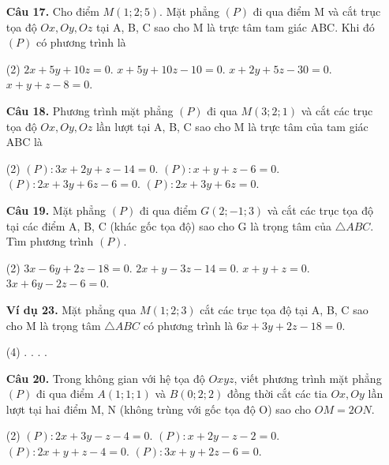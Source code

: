 \documentclass[12pt, a4paper]{article}
\begin{document}
\begin{enumerate}[label=\textbf{\arabic*.}, wide=0pt, leftmargin=*]
    \item[\textbf{Câu 17.}] Cho điểm \(M(1;2;5)\). Mặt phẳng \((P)\) đi qua điểm M và cắt trục tọa độ \(Ox, Oy, Oz\) tại A, B, C sao cho M là trực tâm tam giác ABC. Khi đó \((P)\) có phương trình là
    \begin{tasks}(2)
        \task \(2x+5y+10z=0\).
        \task \(x+5y+10z-10=0\).
        \task \(x+2y+5z-30=0\).
        \task \(x+y+z-8=0\).
    \end{tasks}
    
    \item[\textbf{Câu 18.}] Phương trình mặt phẳng \((P)\) đi qua \(M(3;2;1)\) và cắt các trục tọa độ \(Ox, Oy, Oz\) lần lượt tại A, B, C sao cho M là trực tâm của tam giác ABC là
    \begin{tasks}(2)
        \task \((P): 3x+2y+z-14=0\).
        \task \((P): x+y+z-6=0\).
        \task \((P): 2x+3y+6z-6=0\).
        \task \((P): 2x+3y+6z=0\).
    \end{tasks}
    
    \item[\textbf{Câu 19.}] Mặt phẳng \((P)\) đi qua điểm \(G(2;-1;3)\) và cắt các trục tọa độ tại các điểm A, B, C (khác gốc tọa độ) sao cho G là trọng tâm của \(\triangle ABC\). Tìm phương trình \((P)\).
    \begin{tasks}(2)
        \task \(3x-6y+2z-18=0\).
        \task \(2x+y-3z-14=0\).
        \task \(x+y+z=0\).
        \task \(3x+6y-2z-6=0\).
    \end{tasks}
    
    
    \item[\textbf{Ví dụ 23.}] Mặt phẳng qua \(M(1;2;3)\) cắt các trục tọa độ tại A, B, C sao cho M là trọng tâm \(\triangle ABC\) có phương trình là \(6x+3y+2z-18=0\).
    \begin{tasks}(4)
        .
        .
        .
        .
    \end{tasks}
    
    \item[\textbf{Câu 20.}] Trong không gian với hệ tọa độ \(Oxyz\), viết phương trình mặt phẳng \((P)\) đi qua điểm \(A(1;1;1)\) và \(B(0;2;2)\) đồng thời cắt các tia \(Ox, Oy\) lần lượt tại hai điểm M, N (không trùng với gốc tọa độ O) sao cho \(OM=2ON\).
    \begin{tasks}(2)
        \task \((P): 2x+3y-z-4=0\).
        \task \((P): x+2y-z-2=0\).
        \task \((P): 2x+y+z-4=0\).
        \task \((P): 3x+y+2z-6=0\).
    \end{tasks}
    

\end{enumerate}
\end{document}
